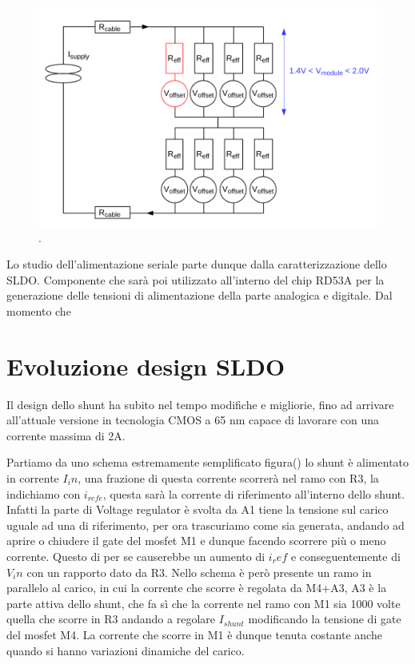 \begin{figure}
\centering
\includegraphics[scale=.3]{Immagini/MultiChipModules}
\caption{.}
\label{MCM}
\end{figure}

Lo studio dell'alimentazione seriale parte dunque dalla caratterizzazione dello SLDO. Componente che sarà poi utilizzato all'interno del chip RD53A per la generazione delle tensioni di alimentazione della parte analogica e digitale. Dal momento che 


\section{Evoluzione design SLDO}
Il design dello shunt ha subito nel tempo modifiche e migliorie, fino ad arrivare all'attuale versione in tecnologia CMOS a 65 nm capace di lavorare con una corrente massima di 2A.

Partiamo da uno schema estremamente semplificato figura() lo shunt è alimentato in corrente $I_in$, una frazione di questa corrente scorrerà nel ramo con R3, la indichiamo con $i_{refe}$, questa sarà la corrente di riferimento all'interno dello shunt. Infatti la parte di Voltage regulator è svolta da A1 tiene la tensione sul carico uguale ad una di riferimento, per ora trascuriamo come sia generata, andando ad aprire o chiudere il gate del mosfet M1 e dunque facendo scorrere più o meno corrente. Questo di per se causerebbe un aumento di $i_ref$ e conseguentemente di $V_in$ con un rapporto dato da R3. Nello schema è però presente un ramo in parallelo al carico, in cui la corrente che scorre è regolata da M4+A3, A3 è la parte attiva dello shunt, che fa sì che la corrente nel ramo con M1 sia 1000 volte quella che scorre in R3 andando a regolare $I_{shunt}$ modificando la tensione di gate del mosfet M4. La corrente che scorre in M1 è dunque tenuta costante anche quando si hanno variazioni dinamiche del carico.

